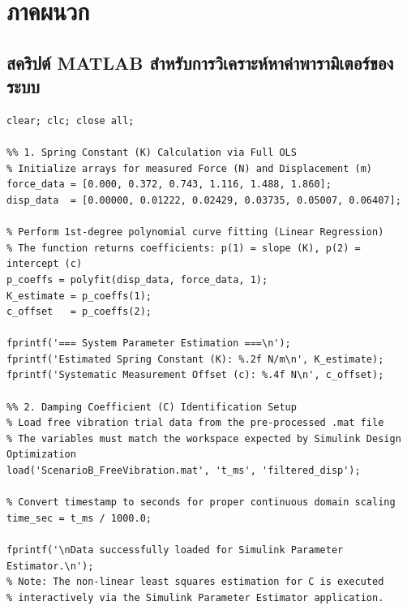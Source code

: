 \section{ภาคผนวก}
\subsection{สคริปต์ MATLAB สำหรับการวิเคราะห์หาค่าพารามิเตอร์ของระบบ}

\lstset{language=Matlab}

\begin{lstlisting}[caption={MATLAB Script for Spring Constant (K) and Damping Coefficient (C) Data Preparation}]
clear; clc; close all;

%% 1. Spring Constant (K) Calculation via Full OLS
% Initialize arrays for measured Force (N) and Displacement (m)
force_data = [0.000, 0.372, 0.743, 1.116, 1.488, 1.860];
disp_data  = [0.00000, 0.01222, 0.02429, 0.03735, 0.05007, 0.06407];

% Perform 1st-degree polynomial curve fitting (Linear Regression)
% The function returns coefficients: p(1) = slope (K), p(2) = intercept (c)
p_coeffs = polyfit(disp_data, force_data, 1);
K_estimate = p_coeffs(1);
c_offset   = p_coeffs(2);

fprintf('=== System Parameter Estimation ===\n');
fprintf('Estimated Spring Constant (K): %.2f N/m\n', K_estimate);
fprintf('Systematic Measurement Offset (c): %.4f N\n', c_offset);

%% 2. Damping Coefficient (C) Identification Setup
% Load free vibration trial data from the pre-processed .mat file
% The variables must match the workspace expected by Simulink Design Optimization
load('ScenarioB_FreeVibration.mat', 't_ms', 'filtered_disp');

% Convert timestamp to seconds for proper continuous domain scaling
time_sec = t_ms / 1000.0;

fprintf('\nData successfully loaded for Simulink Parameter Estimator.\n');
% Note: The non-linear least squares estimation for C is executed 
% interactively via the Simulink Parameter Estimator application.
\end{lstlisting}